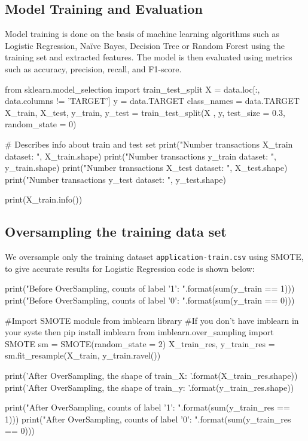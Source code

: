 \documentclass{josis}
\begin{document}
{\subsection{Model Training and Evaluation}
Model training is done on the basis of machine learning algorithms such as Logistic Regression, Naïve Bayes, Decision Tree or Random Forest using the training set and extracted features. The model is then evaluated using metrics such as accuracy, precision, recall, and F1-score.
\begin{python}
from sklearn.model_selection import train_test_split
X = data.loc[:, data.columns != 'TARGET']
y = data.TARGET
class_names = data.TARGET
X_train, X_test, y_train, y_test = train_test_split(X , y, test_size = 0.3, random_state = 0)

# Describes info about train and test set 
print("Number transactions X_train dataset: ", X_train.shape) 
print("Number transactions y_train dataset: ", y_train.shape) 
print("Number transactions X_test dataset: ", X_test.shape) 
print("Number transactions y_test dataset: ", y_test.shape)

print(X_train.info())
\end{python}

\subsection{Oversampling the training data set}
We oversample only the training dataset {\texttt{application-train.csv}} using SMOTE, to give accurate results for Logistic Regression code is shown below:
\begin{python}
print("Before OverSampling, counts of label '1': {}".format(sum(y_train == 1))) 
print("Before OverSampling, counts of label '0': {} \n".format(sum(y_train == 0)))
  
#Import SMOTE module from imblearn library 
#If you don't have imblearn in your syste then pip install imblearn  
from imblearn.over_sampling import SMOTE 
sm = SMOTE(random_state = 2) 
X_train_res, y_train_res = sm.fit_resample(X_train, y_train.ravel()) 

print('After OverSampling, the shape of train_X: {}'.format(X_train_res.shape)) 
print('After OverSampling, the shape of train_y: {} \n'.format(y_train_res.shape)) 

print("After OverSampling, counts of label '1': {}".format(sum(y_train_res == 1))) 
print("After OverSampling, counts of label '0': {}".format(sum(y_train_res == 0)))  
\end{python}

}
\end{document}
